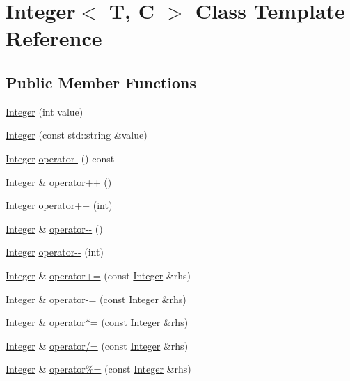 \hypertarget{class_integer}{}\section{Integer$<$ T, C $>$ Class Template Reference}
\label{class_integer}
\subsection*{Public Member Functions}
\begin{DoxyCompactItemize}
\item 
\hyperlink{class_integer_a1d5315e4ec5b56b8cb3a6991d514f7d6}{Integer} (int value)
\item 
\hyperlink{class_integer_afebf72d47413ceedcc30b74c3055b771}{Integer} (const std\+::string \&value)
\item 
\hyperlink{class_integer}{Integer} \hyperlink{class_integer_ae9d1fb575b55ac2f6352a2d735c4bb75}{operator-\/} () const 
\item 
\hyperlink{class_integer}{Integer} \& \hyperlink{class_integer_a3fc47ae07dce44aa72ce9e02b9a3e003}{operator++} ()
\item 
\hyperlink{class_integer}{Integer} \hyperlink{class_integer_a326d5bd7d72ad858f523bed95ae66150}{operator++} (int)
\item 
\hyperlink{class_integer}{Integer} \& \hyperlink{class_integer_ac6227ea2b4a75ff08d537db0d3a26be4}{operator-\/-\/} ()
\item 
\hyperlink{class_integer}{Integer} \hyperlink{class_integer_ae5b697679221dbf1fbc942335bb19fb4}{operator-\/-\/} (int)
\item 
\hyperlink{class_integer}{Integer} \& \hyperlink{class_integer_a0c37e366a26b17cfd73b1b29a1e8b47b}{operator+=} (const \hyperlink{class_integer}{Integer} \&rhs)
\item 
\hyperlink{class_integer}{Integer} \& \hyperlink{class_integer_a2bff1e6dc8f6990028783da8bdd89b0d}{operator-\/=} (const \hyperlink{class_integer}{Integer} \&rhs)
\item 
\hyperlink{class_integer}{Integer} \& \hyperlink{class_integer_acf1388dc4ce49c9b7d69b3b6c3a245f7}{operator$\ast$=} (const \hyperlink{class_integer}{Integer} \&rhs)
\item 
\hyperlink{class_integer}{Integer} \& \hyperlink{class_integer_aa13c715bbc68c58c2bd1f1b49a80277e}{operator/=} (const \hyperlink{class_integer}{Integer} \&rhs)
\item 
\hyperlink{class_integer}{Integer} \& \hyperlink{class_integer_a5af44fd8bef5e32fa720b1262045f1b7}{operator\%=} (const \hyperlink{class_integer}{Integer} \&rhs)

\end{DoxyCompactItemize}
